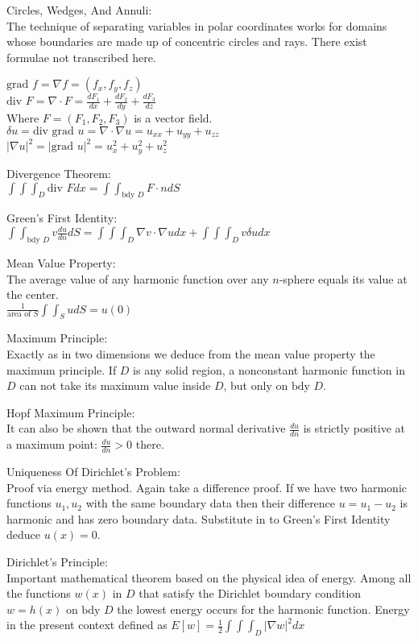 Circles, Wedges, And Annuli: \\
The technique of separating variables in polar coordinates works for domains whose boundaries are made up of concentric circles and rays. There exist formulae not transcribed here.

$\text{grad }f=\nabla f=(f_x,f_y,f_z)$ \\
$\text{div }F=\nabla \cdot F=\frac{dF_1}{dx}+\frac{dF_2}{dy}+\frac{dF_3}{dz}$ \\
Where $F=(F_1,F_2,F_3)$ is a vector field. \\
$\delta u=\text{div grad }u=\nabla \cdot \nabla u=u_{xx}+u_{yy}+u_{zz}$ \\
$|\nabla u|^2 = |\text{grad }u|^2 = u_x^2 + u_y^2 + u_z^2$

Divergence Theorem: \\
$\int \int \int_{D} \text{div }F dx=\int \int_{\text{bdy }D}F \cdot n dS$

Green's First Identity: \\
$\int \int_{\text{bdy }D}v \frac{du}{dn} dS = \int \int \int_D \nabla v \cdot \nabla u dx + \int \int \int_D v \delta u dx$

Mean Value Property: \\
The average value of any harmonic function over any $n$-sphere equals its value at the center. \\
$\frac{1}{\text{area of }S} \int \int_S u dS = u(0)$

Maximum Principle: \\
Exactly as in two dimensions we deduce from the mean value property the maximum principle. If $D$ is any solid region, a nonconstant harmonic function in $D$ can not take its maximum value inside $D$, but only on $\text{bdy }D$.

Hopf Maximum Principle: \\
It can also be shown that the outward normal derivative $\frac{du}{dn}$ is strictly positive at a maximum point: $\frac{du}{dn} > 0$ there.

Uniqueness Of Dirichlet's Problem: \\
Proof via energy method. Again take a difference proof. If we have two harmonic functions $u_1,u_2$ with the same boundary data then their difference $u=u_1-u_2$ is harmonic and has zero boundary data. Substitute in to Green's First Identity deduce $u(x)=0$.

Dirichlet's Principle: \\
Important mathematical theorem based on the physical idea of energy. Among all the functions $w(x)$ in $D$ that satisfy the Dirichlet boundary condition $w=h(x)$ on $\text{bdy }D$ the lowest energy occurs for the harmonic function. Energy in the present context defined as $E[w]=\frac{1}{2} \int \int \int_D |\nabla w|^2 dx$


